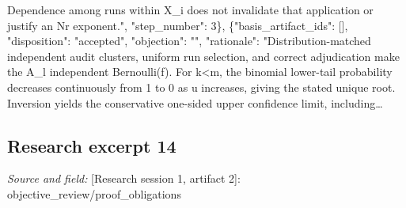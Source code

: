 \documentclass[11pt]{article}
\begin{document}
Dependence among runs within X\_i does not invalidate that application or justify an Nr exponent.", "step\_number": 3\}, \{"basis\_artifact\_ids": [], "disposition": "accepted", "objection": "", "rationale": "Distribution-matched independent audit clusters, uniform run selection, and correct adjudication make the A\_l independent Bernoulli(f). For k\textless{}m, the binomial lower-tail probability decreases continuously from 1 to 0 as u increases, giving the stated unique root. Inversion yields the conservative one-sided upper confidence limit, including\ldots{}

\subsection{Research excerpt 14}
\textit{Source and field: }[Research session 1, artifact 2]: objective\_review/proof\_obligations\par
["Analytically discharged within the conditional model, cycle 1, current Investigator reasoning entries 1\textendash{}3: construct indistinguishable histories and establish the sharp minimax error bound.", "Analytically discharged within the conditional model, cycle 1, current Investigator reasoning entry 4: distinguish conditional average error from worst-case error and overall deployment failure.", "Analytically discharged within the conditional model, cycle 1, current Investigator reasoning entries 5\textendash{}6: explain why local rollback is insufficient and why atomic durable same-key deduplication preserves exactly one effect.", "Open: establish that a concrete harness implements the assumed information boundary and transition semantics.", "Open: establish that concrete agent policies and services satisfy the repair assumptions.", "Open: measure controlled agent-level outcomes and establish the applicability limits for deployment and multi-step workflows."]
\end{document}
